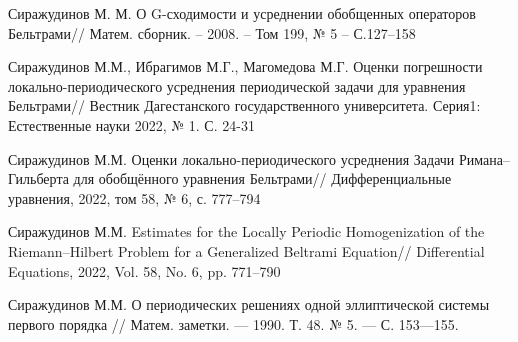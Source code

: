 \documentclass[a4paper,12pt]{article}
\theoremstyle{definition}
\begin{document}
\begin{thebibliography}{22}
  Сиражудинов М. М. О G-сходимости и усреднении обобщенных операторов Бельтрами// Матем. сборник. – 2008. – Том 199, № 5 – С.127–158

  	Сиражудинов М.М., Ибрагимов М.Г., Магомедова М.Г. Оценки погрешности локально-периодического усреднения периодической задачи для уравнения Бельтрами// Вестник Дагестанского государственного университета. Серия1: Естественные науки 2022, № 1. С. 24-31

  	Сиражудинов М.М. Оценки локально-периодического усреднения Задачи Римана–Гильберта для обобщённого уравнения Бельтрами// Дифференциальные уравнения, 2022, том 58, № 6, с. 777–794

  	Сиражудинов М.М. Estimates for the Locally Periodic Homogenization of the Riemann–Hilbert Problem for a Generalized Beltrami Equation// Differential Equations, 2022, Vol. 58, No. 6, pp. 771–790

   Сиражудинов М.М. О периодических решениях одной
  	эллиптической системы первого порядка //  Матем. заметки.
  	--- 1990.  Т. 48. № 5. --- С. 153---155.
\end{thebibliography}
\end{document}
